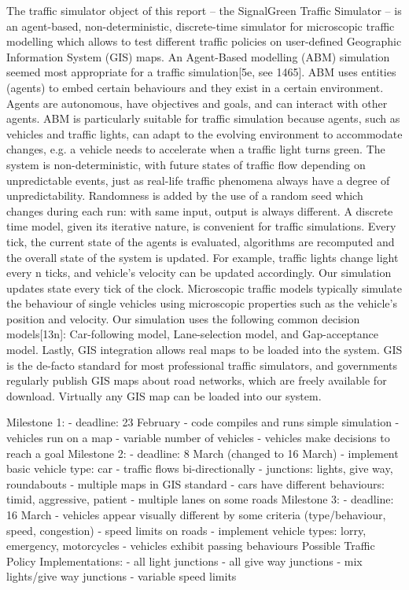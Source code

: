 \documentclass[11pt]{article}
\begin{document}
The traffic simulator object of this report – the SignalGreen Traffic Simulator – is an agent-based, non-deterministic, discrete-time simulator for microscopic traffic modelling which allows to test different traffic policies on user-defined Geographic Information System (GIS) maps. 
An Agent-Based modelling (ABM) simulation seemed most appropriate for a traffic simulation[5e, see 1465]. ABM uses entities (agents) to embed certain behaviours and they exist in a certain environment. Agents are autonomous, have objectives and goals, and can interact with other agents. ABM is particularly suitable for traffic simulation because agents, such as vehicles and traffic lights, can adapt to the evolving environment to accommodate changes, e.g. a vehicle needs to accelerate when a traffic light turns green.
The system is non-deterministic, with future states of traffic flow depending on unpredictable events, just as real-life traffic phenomena always have a degree of unpredictability. Randomness is added by the use of a random seed which changes during each run: with same input, output is always different.  
A discrete time model, given its iterative nature, is convenient for traffic simulations. Every tick, the current state of the agents is evaluated, algorithms are recomputed and the overall state of the system is updated. For example, traffic lights change light every n ticks, and vehicle’s velocity can be updated accordingly. Our simulation updates state every tick of the clock.
Microscopic traffic models typically simulate the behaviour of single vehicles using microscopic properties such as the vehicle’s position and velocity. Our simulation uses the following common decision models[13n]: Car-following model, Lane-selection model, and Gap-acceptance model.
Lastly, GIS integration allows real maps to be loaded into the system. GIS is the de-facto standard for most professional traffic simulators, and governments regularly publish GIS maps about road networks, which are freely available for download. Virtually any GIS map can be loaded into our system.

Milestone 1:
- deadline: 23 February
- code compiles and runs simple simulation
- vehicles run on a map
- variable number of vehicles
- vehicles make decisions to reach a goal
Milestone 2:
- deadline: 8 March (changed to 16 March)
- implement basic vehicle type: car
- traffic flows bi-directionally
- junctions: lights, give way, roundabouts
- multiple maps in GIS standard
- cars have different behaviours: timid, aggressive, patient
- multiple lanes on some roads
Milestone 3:
- deadline: 16 March
- vehicles appear visually different by some criteria (type/behaviour, speed, congestion)
- speed limits on roads
- implement vehicle types: lorry, emergency, motorcycles
- vehicles exhibit passing behaviours
Possible Traffic Policy Implementations:
- all light junctions
- all give way junctions
- mix lights/give way junctions
- variable speed limits
\end{document}
